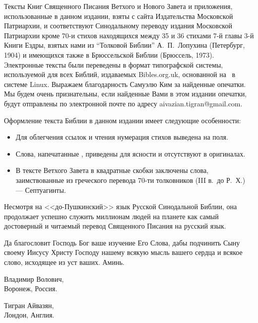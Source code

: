 Тексты Книг Священного Писания Ветхого и Нового Завета и приложения,
использованные в данном издании, взяты с сайта Издательства Московской
Патриархии,
и соответствуют Си\-но\-даль\-но\-му переводу издания Московской Патриархии
кроме 70-и стихов находящихся между 35 и 36 стихами 7-й главы
3-й Книги Ездры, взятых нами из ``Толковой Библии'' А.~П.~Лопухина (Петербург, 1904)
и имеющихся также в Брюссельской Библии (Брюссель, 1973).
Электронные тексты были переведены в формат типографской системы,
используемой для всех Библий, издаваемых Bibles.org.uk, основанной
на \XeLaTeX\ в системе Linux.
Выражаем благодарность Самуэлю Ким за найденные опечатки.
Мы будем очень признательны, если найденные Вами в этом издании
опечатки, будут отправлены по электронной почте по адресу
{\makeatletter aivazian.tigran@gmail.com\makeatother}.

Оформление текста Библии в данном издании имеет следующие особенности:
\begin{itemize}
\item Для облегчения ссылок и чтения нумерация стихов выведена на поля.
\item Слова, напечатанные , приведены для ясности
      и отсутствуют в оригиналах.
\item В тексте Ветхого Завета в квадратные скобки заключены слова,
      заимствованные из греческого перевода 70-ти толковников (III в.~до Р.~Х.)
      --- Септуагинты.
\end{itemize}

Несмотря на <<до-Пушкинский>> язык Русской Синодальной Библии, она
продолжает успешно служить миллионам людей на планете как самый
достоверный и читаемый перевод Священного Писания на русский язык.

Да благословит Господь Бог ваше изучение Его Слова, дабы подчинить
Сыну своему Иисусу Христу Господу нашему всякую мысль вашего сердца
и всякое слово, исходящее из уст ваших. Аминь.

\begingroup
\vfill
\noindent
\itshape
\parbox{4cm}{
Владимир Волович,\\
Воронеж, Россия.
}
\hfill
\parbox{4cm}{
Тигран Айвазян,\\
Лондон, Англия.
}
\vfill
\endgroup
